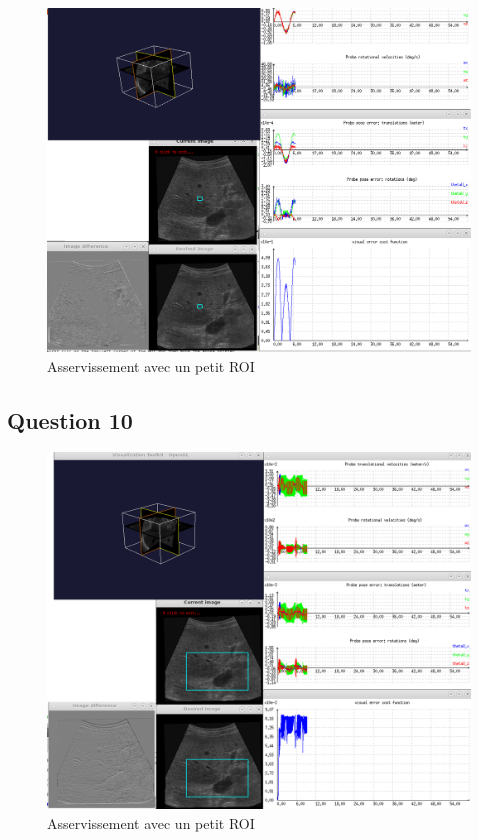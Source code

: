 \documentclass[a4paper,11pt]{article}
\begin{document}
\begin{figure}[!h]
    \centering
    \includegraphics[width=1.0\textwidth]{./images/q9_small.png}
    \caption{Asservissement avec un petit ROI}
    \label{smallRoi}
\end{figure}

\subsection{Question 10}
\begin{figure}[!h]
    \centering
    \includegraphics[width=1.0\textwidth]{./images/q10_big.png}
    \caption{Asservissement avec un petit ROI}
    \label{smallRoi}
\end{figure}
\end{document}
